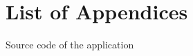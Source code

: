 \appendix
{}
\chapter*{List of Appendices}
\renewcommand{\thesection}{Appendix \Alph{section}}

\begin{section}{Source code of the application}
    \label{appendix:source-code}
\end{section}
\newpage
